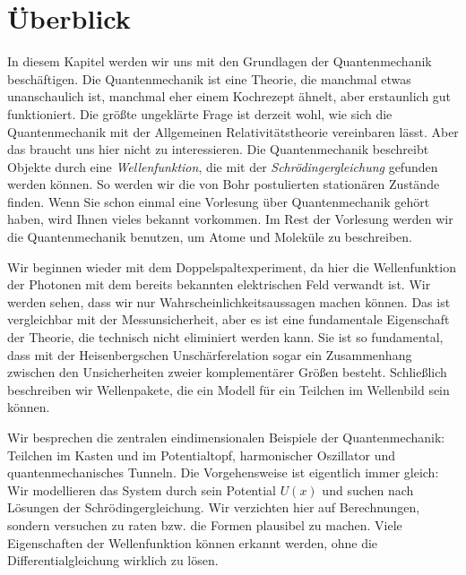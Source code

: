 


\section{Überblick}

In diesem Kapitel werden wir uns mit den Grundlagen der Quantenmechanik beschäftigen. Die Quantenmechanik ist eine Theorie, die manchmal etwas unanschaulich ist, manchmal eher einem Kochrezept ähnelt, aber erstaunlich gut funktioniert. Die größte ungeklärte Frage ist derzeit wohl, wie sich die Quantenmechanik mit der Allgemeinen Relativitätstheorie vereinbaren lässt. Aber das braucht uns hier nicht zu interessieren. Die Quantenmechanik beschreibt Objekte durch eine \emph{Wellenfunktion},  die mit der \emph{Schrödingergleichung} gefunden werden können.  So werden wir die von Bohr postulierten stationären Zustände finden.
Wenn Sie schon einmal eine Vorlesung über Quantenmechanik gehört haben, wird Ihnen vieles bekannt vorkommen. Im Rest der Vorlesung werden wir die Quantenmechanik benutzen, um Atome und Moleküle zu beschreiben.

Wir beginnen wieder mit dem Doppelspaltexperiment, da hier die Wellenfunktion der Photonen mit dem bereits bekannten elektrischen Feld verwandt ist. Wir werden sehen, dass wir nur Wahrscheinlichkeitsaussagen machen können. Das ist vergleichbar mit der Messunsicherheit, aber es ist eine fundamentale Eigenschaft der Theorie, die technisch nicht eliminiert werden kann. Sie ist so fundamental, dass mit der Heisenbergschen Unschärferelation sogar ein Zusammenhang zwischen den Unsicherheiten zweier komplementärer Größen besteht. Schließlich beschreiben wir Wellenpakete, die ein Modell für ein Teilchen im Wellenbild sein können.

Wir besprechen die zentralen eindimensionalen Beispiele der Quantenmechanik: Teilchen im Kasten und im Potentialtopf, harmonischer Oszillator und quantenmechanisches Tunneln. Die Vorgehensweise ist eigentlich immer gleich: Wir modellieren das System durch sein Potential $U(x)$ und suchen nach Lösungen der Schrödingergleichung. Wir verzichten hier auf Berechnungen, sondern versuchen zu raten bzw. die Formen plausibel zu machen. Viele Eigenschaften der Wellenfunktion können erkannt werden, ohne die Differentialgleichung wirklich zu lösen.

